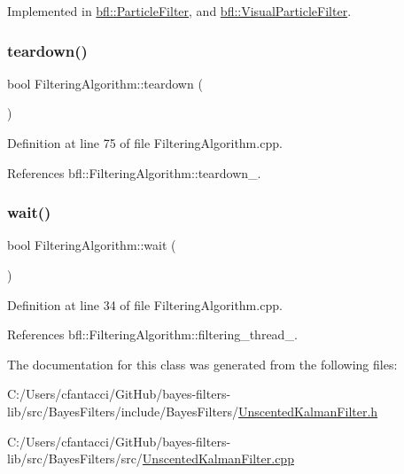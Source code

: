 Implemented in \mbox{\hyperlink{classbfl_1_1ParticleFilter_a2d7a5e7aaad179037273d35be229056d}{bfl\+::\+Particle\+Filter}}, and \mbox{\hyperlink{classbfl_1_1VisualParticleFilter_aab68e455c645bc1b7b8c3c2b476c2f9c}{bfl\+::\+Visual\+Particle\+Filter}}.

\mbox{\label{classbfl_1_1FilteringAlgorithm_a1dc912d89ee8f96d4f3e8209865c5308}} 
\subsubsection{\texorpdfstring{teardown()}{teardown()}}
{\footnotesize\ttfamily bool Filtering\+Algorithm\+::teardown (\begin{DoxyParamCaption}{ }\end{DoxyParamCaption})\hspace{0.3cm}{\ttfamily [inherited]}}



Definition at line 75 of file Filtering\+Algorithm.\+cpp.



References bfl\+::\+Filtering\+Algorithm\+::teardown\+\_\+.

\mbox{\label{classbfl_1_1FilteringAlgorithm_a40372c24fa050eb0274371172df0a244}} 
\subsubsection{\texorpdfstring{wait()}{wait()}}
{\footnotesize\ttfamily bool Filtering\+Algorithm\+::wait (\begin{DoxyParamCaption}{ }\end{DoxyParamCaption})\hspace{0.3cm}{\ttfamily [inherited]}}



Definition at line 34 of file Filtering\+Algorithm.\+cpp.



References bfl\+::\+Filtering\+Algorithm\+::filtering\+\_\+thread\+\_\+.



The documentation for this class was generated from the following files\+:\begin{DoxyCompactItemize}
\item 
C\+:/\+Users/cfantacci/\+Git\+Hub/bayes-\/filters-\/lib/src/\+Bayes\+Filters/include/\+Bayes\+Filters/\mbox{\hyperlink{UnscentedKalmanFilter_8h}{Unscented\+Kalman\+Filter.\+h}}\item 
C\+:/\+Users/cfantacci/\+Git\+Hub/bayes-\/filters-\/lib/src/\+Bayes\+Filters/src/\mbox{\hyperlink{UnscentedKalmanFilter_8cpp}{Unscented\+Kalman\+Filter.\+cpp}}\end{DoxyCompactItemize}
